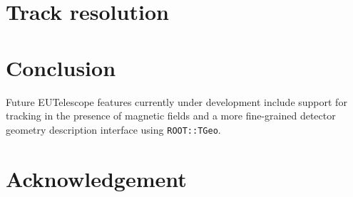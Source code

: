 \documentclass[a4paper,10pt]{scrartcl}
\begin{document}
\section{Track resolution}
\label{sec:trackres}


\section{Conclusion}

Future EUTelescope features currently under development include support for tracking in the presence of magnetic fields and a more fine-grained detector geometry description interface using \texttt{ROOT::TGeo}.

\section*{Acknowledgement}

\small


\end{document}

